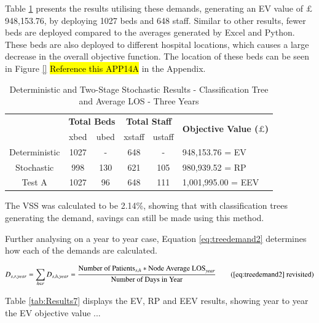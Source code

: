 \documentclass[../thesis.tex]{subfiles}
\begin{document}
Table \ref{tab:Results6} presents the results utilising these demands, generating an EV value of $\pounds$ 948,153.76, by deploying 1027 beds and 648 staff. Similar to other results, fewer beds are deployed compared to the averages generated by Excel and Python. These beds are also deployed to different hospital locations, which causes a large decrease in the overall objective function. The location of these beds can be seen in Figure \ref{} \hl{Reference this APP14A} in the Appendix.


\begin{table}[h!]
    \centering
    \begin{tabular}{cccccl}\toprule
 & \multicolumn{2}{l}{\textbf{Total Beds}} & \multicolumn{2}{c}{\textbf{Total Staff}} & \multirow{2}{*}{\textbf{Objective Value ($\pounds$)}}\\ \cmidrule(lr){2-3} \cmidrule(lr){4-5}
 & xbed           & ubed          & xstaff         & ustaff         \\ \midrule
    Deterministic      & 1027 & - & 648 & - & 948,153.76 = EV \\ \midrule
    Stochastic &998& 130& 621 & 105&  980,939.52 = RP \\ \midrule
    Test A & 1027 & 96 & 648 & 111 & 1,001,995.00 = EEV \\\bottomrule
    \end{tabular}
    \caption{Deterministic and Two-Stage Stochastic Results - Classification Tree and Average LOS - Three Years}
    \label{tab:Results6}
\end{table}

The VSS was calculated to be 2.14\%, showing that with classification trees generating the demand, savings can still be made using this method.

Further analysing on a year to year case, Equation \eqref{eq:treedemand2} determines how each of the demands are calculated.

\begin{equation}
        D_{s,r,year} = \sum\limits_{h \in r} D_{s,h,year} = \frac{\text{Number of Patients}_{s,h}* {\text{Node Average LOS}}_{year}}{\text{Number of Days in Year}} \tag{\ref{eq:treedemand2} revisited}
\end{equation}

Table \ref{tab:Results7} displays the EV, RP and EEV results, showing year to year the EV objective value ...
\end{document}
